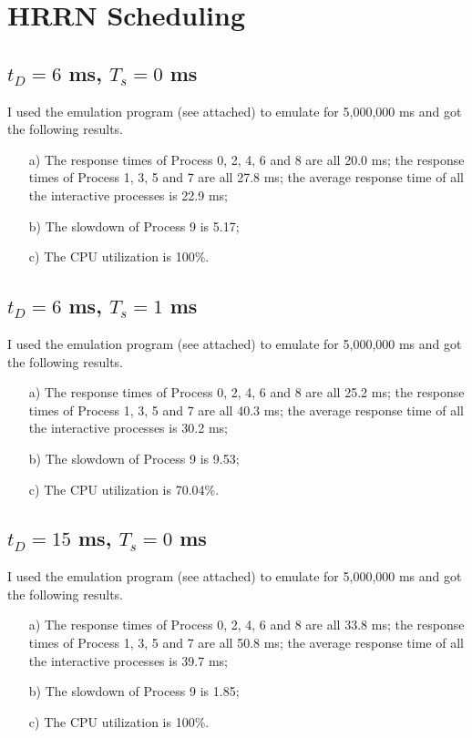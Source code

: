 \documentclass[12pt,letterpaper]{article}
\begin{document}
\section{HRRN Scheduling}
\subsection{$t_D=6$ ms, $T_s = 0$ ms}
I used the emulation program (see attached) to emulate for 5,000,000 ms and got the following results.
\begin{enumerate}
\item[a)] The response times of Process 0, 2, 4, 6 and 8 are all 20.0 ms; the response times of Process 1, 3, 5 and 7 are all 27.8 ms; the average response time of all the interactive processes is 22.9 ms;
\item[b)] The slowdown of Process 9 is 5.17;
\item[c)] The CPU utilization is 100\%.
\end{enumerate}

\subsection{$t_D=6$ ms, $T_s = 1$ ms}
I used the emulation program (see attached) to emulate for 5,000,000 ms and got the following results.
\begin{enumerate}
\item[a)] The response times of Process 0, 2, 4, 6 and 8 are all 25.2 ms; the response times of Process 1, 3, 5 and 7 are all 40.3 ms; the average response time of all the interactive processes is 30.2 ms;
\item[b)] The slowdown of Process 9 is 9.53;
\item[c)] The CPU utilization is 70.04\%.
\end{enumerate}

\subsection{$t_D=15$ ms, $T_s = 0$ ms}
I used the emulation program (see attached) to emulate for 5,000,000 ms and got the following results.
\begin{enumerate}
\item[a)] The response times of Process 0, 2, 4, 6 and 8 are all 33.8 ms; the response times of Process 1, 3, 5 and 7 are all 50.8 ms; the average response time of all the interactive processes is 39.7 ms;
\item[b)] The slowdown of Process 9 is 1.85;
\item[c)] The CPU utilization is 100\%.
\end{enumerate}
\end{document}
